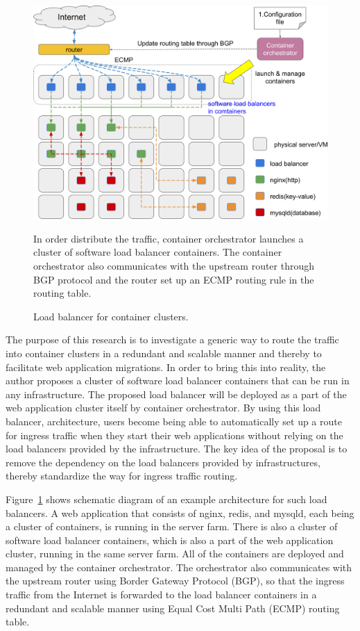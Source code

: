 \begin{figure}[h]
\begin{center}
\includegraphics[width=0.9\columnwidth]{Figs/cluster_of_container_loadbalancer}
\end{center}
\caption{
Load balancer for container clusters.
}
\centering\parbox[c]{0.9\columnwidth}{
In order distribute the traffic, container orchestrator launches a cluster of software load balancer containers. 
The container orchestrator also communicates with the upstream router through BGP protocol and the router set up an ECMP routing rule in the routing table.
}
\label{fig:cluster_of_container_loadbalancer}
\end{figure}

The purpose of this research is to investigate a generic way to route the traffic into container clusters in a redundant and scalable manner and thereby to facilitate web application migrations.
In order to bring this into reality, the author proposes a cluster of software load balancer containers that can be run in any infrastructure.
The proposed load balancer will be deployed as a part of the web application cluster itself by container orchestrator.
By using this load balancer, architecture, users become being able to automatically set up a route for ingress traffic when they start their web applications without relying on the load balancers provided by the infrastructure.
The key idea of the proposal is to remove the dependency on the load balancers provided by infrastructures, thereby standardize the way for ingress traffic routing.

Figure~\ref{fig:cluster_of_container_loadbalancer} shows schematic diagram of an example architecture for such load balancers.
A web application that consists of nginx, redis, and mysqld, each being a cluster of containers, is running in the server farm.
There is also a cluster of software load balancer containers, which is also a part of the web application cluster, running in the same server farm. 
All of the containers are deployed and managed by the container orchestrator.
The orchestrator also communicates with the upstream router using Border Gateway Protocol (BGP), so that the ingress traffic from the Internet is forwarded to the load balancer containers in a redundant and scalable manner using Equal Cost Multi Path (ECMP) \cite{rfc7911} routing table.

